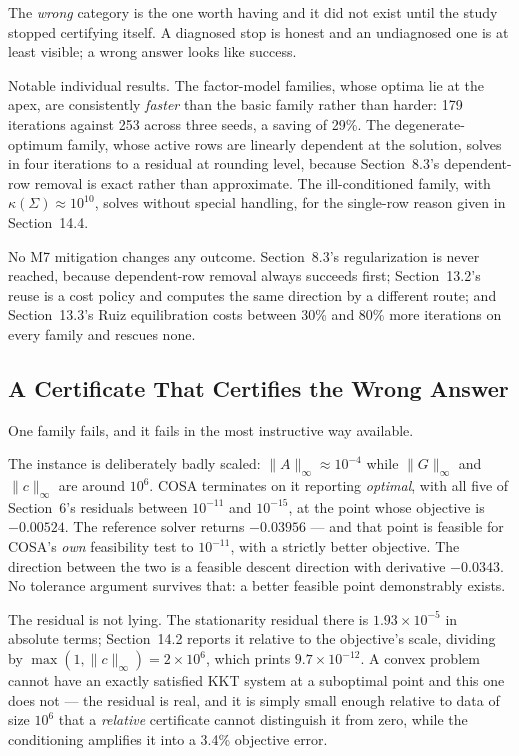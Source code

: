 \documentclass[11pt,a4paper]{article}
\begin{document}
The \emph{wrong} category is the one worth having and it did not exist
until the study stopped certifying itself. A diagnosed stop is honest
and an undiagnosed one is at least visible; a wrong answer looks like
success.

Notable individual results. The factor-model families, whose optima
lie at the apex, are consistently \emph{faster} than the basic family
rather than harder: 179 iterations against 253 across three seeds, a
saving of 29\%. The degenerate-optimum family, whose
active rows are linearly dependent at the solution, solves in four
iterations to a residual at rounding level, because Section~8.3's
dependent-row removal is exact rather than approximate. The
ill-conditioned family, with $\kappa(\Sigma)\approx10^{10}$, solves
without special handling, for the single-row reason given in
Section~14.4.

No M7 mitigation changes any outcome. Section~8.3's regularization is
never reached, because dependent-row removal always succeeds first;
Section~13.2's reuse is a cost policy and computes the same direction
by a different route; and Section~13.3's Ruiz equilibration costs
between 30\% and 80\% more iterations on every family and rescues
none.

\subsection{A Certificate That Certifies the Wrong Answer}

One family fails, and it fails in the most instructive way available.

The instance is deliberately badly scaled: $\|A\|_\infty\approx10^{-4}$
while $\|G\|_\infty$ and $\|c\|_\infty$ are around $10^{6}$. COSA
terminates on it reporting \emph{optimal}, with all five of
Section~6's residuals between $10^{-11}$ and $10^{-15}$, at the point
whose objective is $-0.00524$. The reference solver returns $-0.03956$
--- and that point is feasible for COSA's \emph{own} feasibility test
to $10^{-11}$, with a strictly better objective. The direction between
the two is a feasible descent direction with derivative $-0.0343$. No
tolerance argument survives that: a better feasible point
demonstrably exists.

The residual is not lying. The stationarity residual there is
$1.93\times10^{-5}$ in absolute terms; Section~14.2 reports it
relative to the objective's scale, dividing by
$\max(1,\|c\|_\infty)=2\times10^{6}$, which prints $9.7\times10^{-12}$.
A convex problem cannot have an exactly satisfied KKT system at a
suboptimal point and this one does not --- the residual is real, and
it is simply small enough relative to data of size $10^{6}$ that a
\emph{relative} certificate cannot distinguish it from zero, while the
conditioning amplifies it into a 3.4\% objective error.
\end{document}
